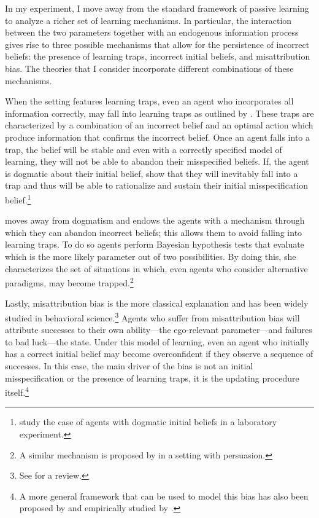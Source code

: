\documentclass[
  12pt,
]{article}
\begin{document}
In my experiment, I move away from the standard framework of passive
learning to analyze a richer set of learning mechanisms. In particular,
the interaction between the two parameters together with an endogenous
information process gives rise to three possible mechanisms that allow
for the persistence of incorrect beliefs: the presence of learning
traps, incorrect initial beliefs, and misattribution bias. The theories
that I consider incorporate different combinations of these mechanisms.

When the setting features learning traps, even an agent who incorporates
all information correctly, may fall into learning traps as outlined by
\citet{Hestermann2021}. These traps are characterized by a combination
of an incorrect belief and an optimal action which produce information
that confirms the incorrect belief. Once an agent falls into a trap, the
belief will be stable and even with a correctly specified model of
learning, they will not be able to abandon their misspecified beliefs.
If, the agent is dogmatic about their initial belief,
\citet{Heidhues2018} show that they will inevitably fall into a trap and
thus will be able to rationalize and sustain their initial
misspecification
belief.\footnote{\citet{Gotte2022} study the case of agents with dogmatic initial beliefs in a 
laboratory experiment.}

\citet{Ba2023} moves away from dogmatism and endows the agents with a
mechanism through which they can abandon incorrect beliefs; this allows
them to avoid falling into learning traps. To do so agents perform
Bayesian hypothesis tests that evaluate which is the more likely
parameter out of two possibilities. By doing this, she characterizes the
set of situations in which, even agents who consider alternative
paradigms, may become trapped.\footnote{A 
similar mechanism is proposed by \citet{Schwarstein2021} in a setting with persuasion.}

Lastly, misattribution bias is the more classical explanation and has
been widely studied in behavioral
science.\footnote{See \citet{kelley1980} for a review.} Agents who
suffer from misattribution bias will attribute successes to their own
ability---the ego-relevant parameter---and failures to bad luck---the
state. Under this model of learning, even an agent who initially has a
correct initial belief may become overconfident if they observe a
sequence of successes. In this case, the main driver of the bias is not
an initial misspecification or the presence of learning traps, it is the
updating procedure
itself.\footnote{A more general framework that can be used to model 
this bias has also been proposed by \citet{Brunnermeier2005} and empirically studied by \citet{Bracha2012}.}
\end{document}
